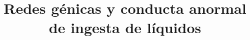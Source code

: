 \documentclass{bmcart}
\begin{document}
	\begin{frontmatter}
	
		\begin{fmbox}
			
			
			\title{Redes génicas y conducta anormal de ingesta de líquidos}
			
			
			\author[
			  addressref={aff1},                   %
			  corref={aff1},                       %
			  email={alvarogv@uma.es}   	%
			]{ }
			\author[
			addressref={aff1},
			email={barakat@uma.es}
			]{ } 
			\author[
			addressref={aff1},
			email={carlosmarin@uma.es}
			]{ }
			\author[
			  addressref={aff1},  
			  email={luciajv2003@uma.es}
			]{ }
			\author[
			  addressref={aff1},
			  email={john.RS.Smith@cambridge.co.uk}
			]{ }
			
			
			\address[id=aff1]{%
			  ,             %
			  ,          %
			  ,                              %
			}
		
		\end{fmbox}%
		
		\begin{abstractbox}
		
			\begin{abstract} %
			
			

\end{abstract}
\end{abstractbox}
\end{frontmatter}
\end{document}
